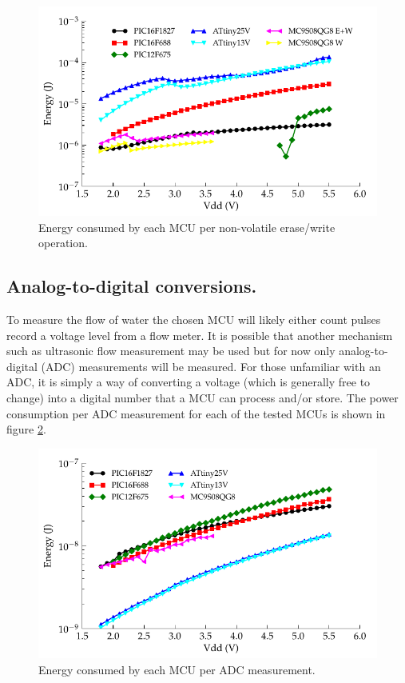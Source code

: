 \begin{figure}
\begin{centering}
\includegraphics{content/pt1/02-Microcontrollers/graphics/Graph_All_EEPROM_JPO}
\par\end{centering}

\protect\caption{Energy consumed by each MCU per non-volatile erase/write operation.\label{fig:Energy-consumed-EEPROM}}
\end{figure}



\subsection{Analog-to-digital conversions.}

To measure the flow of water the chosen MCU will likely either count
pulses record a voltage level from a flow meter. It is possible that
another mechanism such as ultrasonic flow measurement may be used
but for now only analog-to-digital (ADC) measurements will be measured.
For those unfamiliar with an ADC, it is simply a way of converting
a voltage (which is generally free to change) into a digital number
that a MCU can process and/or store. The power consumption per ADC
measurement for each of the tested MCUs is shown in figure \ref{fig:Energy-consumed-ADC}.

\begin{figure}
\begin{centering}
\includegraphics{content/pt1/02-Microcontrollers/graphics/Graph_ALL_ADC_JPM}
\protect\caption{Energy consumed by each MCU per ADC measurement.\label{fig:Energy-consumed-ADC}}

\par\end{centering}

\end{figure}

